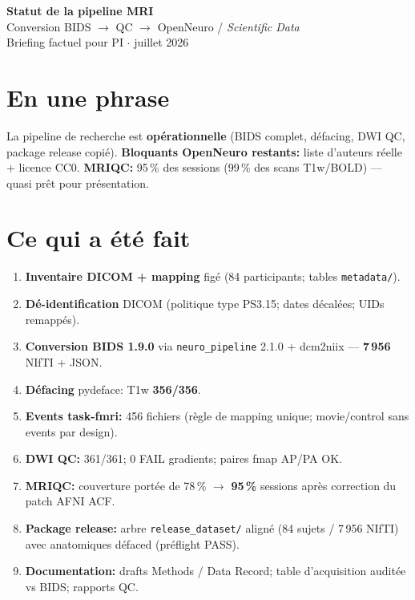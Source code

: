 \documentclass[11pt,a4paper]{article}
\begin{document}
\begin{center}
{\LARGE\bfseries Statut de la pipeline MRI}\\[4pt]
{\large Conversion BIDS $\rightarrow$ QC $\rightarrow$ OpenNeuro / \textit{Scientific Data}}\\[3pt]
{\normalsize Briefing factuel pour PI \quad$\cdot$ juillet 2026}
\end{center}

\vspace{3mm}
\section*{En une phrase}
La pipeline de recherche est \textbf{opérationnelle} (BIDS complet, défacing, DWI QC, package release copié).  
\textbf{Bloquants OpenNeuro restants:} liste d'auteurs réelle + licence CC0.  
\textbf{MRIQC:} 95\,\% des sessions (99\,\% des scans T1w/BOLD) --- quasi prêt pour présentation.

\section{Ce qui a été fait}

\begin{enumerate}
\item \textbf{Inventaire DICOM + mapping} figé (84 participants; tables \texttt{metadata/}).
\item \textbf{Dé-identification} DICOM (politique type PS3.15; dates décalées; UIDs remappés).
\item \textbf{Conversion BIDS 1.9.0} via \texttt{neuro\_pipeline} 2.1.0 + dcm2niix --- \textbf{7\,956} NIfTI + JSON.
\item \textbf{Défacing} pydeface: T1w \textbf{356/356}.
\item \textbf{Events task-fmri:} 456 fichiers (règle de mapping unique; movie/control sans events par design).
\item \textbf{DWI QC:} 361/361; 0 FAIL gradients; paires fmap AP/PA OK.
\item \textbf{MRIQC:} couverture portée de 78\,\% $\rightarrow$ \textbf{95\,\%} sessions après correction du patch AFNI ACF.
\item \textbf{Package release:} arbre \texttt{release\_dataset/} aligné (84 sujets / 7\,956 NIfTI) avec anatomiques défaced (préflight PASS).
\item \textbf{Documentation:} drafts Methods / Data Record; table d'acquisition auditée vs BIDS; rapports QC.
\end{enumerate}
\end{document}
